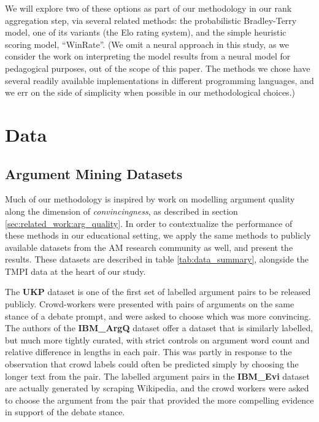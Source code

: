\documentclass[notitlepage,12pt]{jedm}
\begin{document}
We will explore two of these options as part of our methodology in our rank 
aggregation step, via several related methods: the probabilistic Bradley-Terry 
model, one of its variants (the Elo rating system), and the simple heuristic 
scoring model, ``WinRate''.
(We omit a neural approach in this study, as we consider the work on 
interpreting the model results from a neural model for pedagogical purposes, 
out of the scope of this paper.
The methods we chose have several readily available implementations in 
different programming languages, and we err on the side of simplicity when 
possible in our methodological choices.)



\section{Data}\label{sec:datasets}

\subsection{Argument Mining Datasets}
Much of our methodology is inspired by work on modelling argument quality along 
the dimension of \textit{convincingness}, as described in section 
\ref{sec:related_work:arg_quality}. 
In order to contextualize the performance of these methods in our educational 
setting, we apply the same methods to publicly available datasets from the 
AM research community as well, and present the results. 
These datasets are described in table \ref{tab:data_summary}, alongside the 
TMPI data at the heart of our study. 

The \textbf{UKP} dataset \cite{habernal_which_2016} is one of the first set of 
labelled argument pairs to be released publicly.
Crowd-workers were presented with pairs of arguments on the same stance of a 
debate prompt, and were asked to choose which was more convincing.
The authors of the \textbf{IBM\_ArgQ} dataset \cite{toledo_automatic_2019} 
offer a dataset that is similarly labelled, but much more tightly curated, with 
strict controls on argument word count and relative difference in lengths in 
each pair.
This was partly in response to the observation that crowd labels could often be 
predicted simply by choosing the longer text from the pair.
The labelled argument pairs in the \textbf{IBM\_Evi} dataset 
\cite{gleize_are_2019} are actually generated by scraping Wikipedia, and the 
crowd workers were asked to choose the argument from the pair that provided the 
more compelling evidence in support of the debate stance.
\end{document}
